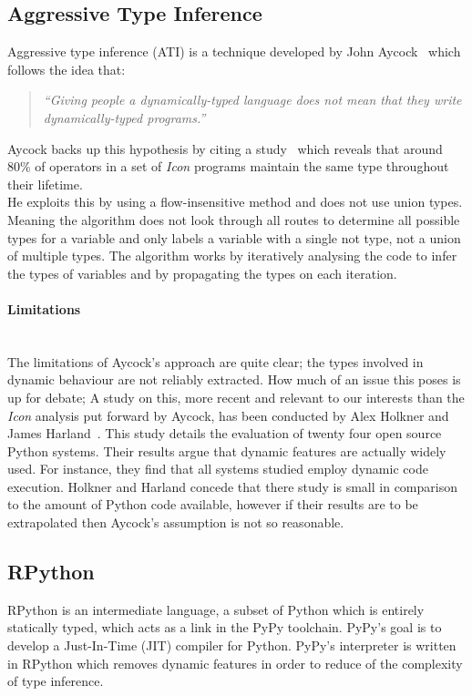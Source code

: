 \documentclass[12pt, titlepage]{article}
\begin{document}
\subsection{Aggressive Type Inference}
Aggressive type inference (ATI) is a technique developed by John Aycock~\cite{aggressiveType} which follows the idea that:
\begin{quote}
	\emph{``Giving people a dynamically-typed language does not mean that they write dynamically-typed programs.''}
\end{quote}
Aycock backs up this hypothesis by citing a study~\cite{typeInferenceIcon} which reveals that around 80\% of operators in a set of \textit{Icon} programs maintain the same type throughout their lifetime. \\
He exploits this by using a flow-insensitive method and does not use union types. Meaning the algorithm does not look through all routes to determine all possible types for a variable and only labels a variable with a single not type, not a union of multiple types. The algorithm works by iteratively analysing the code to infer the types of variables and by propagating the types on each iteration.
\paragraph{Limitations}\mbox{}\\
The limitations of Aycock's approach are quite clear; the types involved in dynamic behaviour are not reliably extracted. How much of an issue this poses is up for debate;
A study on this, more recent and relevant to our interests than the \textit{Icon} analysis put forward by Aycock, has been conducted by Alex Holkner and James Harland~\cite{evaluatingDynamicBehaviour}. This study details the evaluation of twenty four open source Python systems. Their results argue that dynamic features are actually widely used. For instance, they find that all systems studied employ dynamic code execution. Holkner and Harland concede that there study is small in comparison to the amount of Python code available, however if their results are to be extrapolated then Aycock's assumption is not so reasonable.

\subsection{RPython}
RPython is an intermediate language, a subset of Python which is entirely statically typed, which acts as a link in the PyPy toolchain. PyPy's goal is to develop a Just-In-Time (JIT) compiler for Python. PyPy's interpreter is written in RPython which removes dynamic features in order to reduce of the complexity of type inference.
\end{document}
